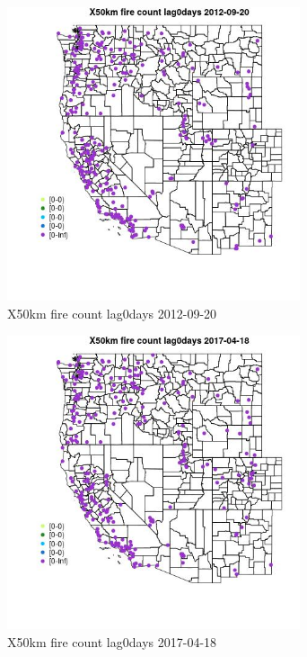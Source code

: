 \begin{figure} 
\centering  
\includegraphics[width=0.77\textwidth]{Code_Outputs/Report_ML_input_PM25_Step4_part_e_de_duplicated_aves_compiled_2019-05-14wNAs_MapObsX50km_fire_count_lag0days2012-09-20.jpg} 
\caption{\label{fig:Report_ML_input_PM25_Step4_part_e_de_duplicated_aves_compiled_2019-05-14wNAsMapObsX50km_fire_count_lag0days2012-09-20}X50km fire count lag0days 2012-09-20} 
\end{figure} 
 

\begin{figure} 
\centering  
\includegraphics[width=0.77\textwidth]{Code_Outputs/Report_ML_input_PM25_Step4_part_e_de_duplicated_aves_compiled_2019-05-14wNAs_MapObsX50km_fire_count_lag0days2017-04-18.jpg} 
\caption{\label{fig:Report_ML_input_PM25_Step4_part_e_de_duplicated_aves_compiled_2019-05-14wNAsMapObsX50km_fire_count_lag0days2017-04-18}X50km fire count lag0days 2017-04-18} 
\end{figure} 
 

